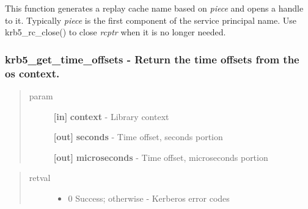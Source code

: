 \documentclass[letterpaper,10pt,english]{sphinxmanual}
\begin{document}
This function generates a replay cache name based on \emph{piece} and opens a handle to it. Typically \emph{piece} is the first component of the service principal name. Use krb5\_rc\_close() to close \emph{rcptr} when it is no longer needed.


\subsubsection{krb5\_get\_time\_offsets -  Return the time offsets from the os context.}
\label{appdev/refs/api/krb5_get_time_offsets:krb5-get-time-offsets-return-the-time-offsets-from-the-os-context}\label{appdev/refs/api/krb5_get_time_offsets::doc}

\begin{fulllineitems}
\label{appdev/refs/api/krb5_get_time_offsets:c.krb5_get_time_offsets}
\end{fulllineitems}

\begin{quote}\begin{description}
\item[{param}] \leavevmode
\textbf{{[}in{]}} \textbf{context} - Library context

\textbf{{[}out{]}} \textbf{seconds} - Time offset, seconds portion

\textbf{{[}out{]}} \textbf{microseconds} - Time offset, microseconds portion

\end{description}\end{quote}
\begin{quote}\begin{description}
\item[{retval}] \leavevmode\begin{itemize}
\item {} 
0   Success; otherwise - Kerberos error codes

\end{itemize}

\end{description}\end{quote}
\end{document}
